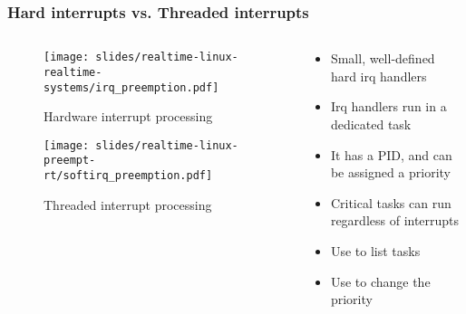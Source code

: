 \begin{frame}
        \frametitle{Hard interrupts vs. Threaded interrupts}

        \begin{columns}
        \begin{column}{0.50\textwidth}
        \vspace{-1cm}
        \begin{figure}
        \texttt{[image: slides/realtime-linux-realtime-systems/irq\_preemption.pdf]}
        \vspace{-1cm}
        \caption{Hardware interrupt processing}
        \end{figure}
        \vspace{-0.6cm}
        \begin{figure}
        \texttt{[image: slides/realtime-linux-preempt-rt/softirq\_preemption.pdf]}
        \vspace{-0.8cm}
        \caption{Threaded interrupt processing}
        \end{figure}
        \end{column}

                \begin{column}{0.50\textwidth}
                        \begin{itemize}
                                \item Small, well-defined hard irq handlers
                                \item Irq handlers run in a dedicated task
                                \item It has a PID, and can be assigned a priority
                                \item Critical tasks can run regardless of interrupts
                                \item Use  to list tasks
                                \item Use  to change the priority
                        \end{itemize}
                \end{column}
        \end{columns}
\end{frame}


